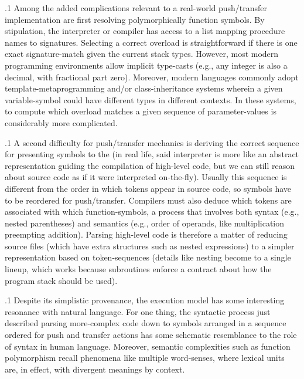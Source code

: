 \documentclass[11pt, twocolumn]{article}
\begin{document}
\p.1{%
\:\+Among the added complications relevant to a real-world push/transfer
implementation are \mdash{} first \mdash{} resolving polymorphically
 function symbols. \>  By stipulation, the interpreter or compiler
has access to a list mapping procedure names to signatures. \> 
Selecting a correct overload is straightforward if there is one exact
signature-match given the current stack types. \>  However, most modern
programming environments allow implicit type-casts (e.g., any integer is also
a decimal, with fractional part zero). \>  Moreover, modern languages commonly
adopt template-metaprogramming and/or class-inheritance systems wherein
a given variable-symbol could have different types in different
contexts. \>  In these systems, to compute which overload matches a
given sequence of parameter-values is considerably more complicated.\<\;
}%

\p.1{%
\:\+A second difficulty for push/transfer mechanics is deriving the correct
sequence for presenting symbols to the  (in real life, said
interpreter is more like an abstract representation guiding the compilation
of high-level code, but we can still reason about source
code as if it were interpreted on-the-fly). \>  Usually this sequence is
different from the order in which tokens appear in source code, so symbols
have to be reordered for push/transfer. \>  Compilers must also deduce which tokens
are associated with which function-symbols, a process that involves
both syntax (e.g., nested parentheses) and semantics (e.g., order of operands,
like multiplication preempting addition). \>  Parsing high-level code is therefore a
matter of reducing source files (which have extra structures such as nested
expressions) to a simpler representation based on token-sequences
(details like nesting become  to a single lineup, which works
because subroutines enforce a contract about how the program stack should be used).\<\;
}%

\p.1{%
\:\+Despite its simplistic provenance, the  execution model
has some interesting resonance with natural language. \>  For one
thing, the syntactic process just described \mdash{} parsing more-complex
code down to symbols arranged in a sequence ordered for push and transfer
actions \mdash{} has some schematic resemblance to the role of syntax
in human language. \>  Moreover, semantic complexities such as
function polymorphism recall phenomena like multiple word-senses,
where lexical units are, in effect,  with divergent
meanings by context.\<\;
}%
\end{document}
